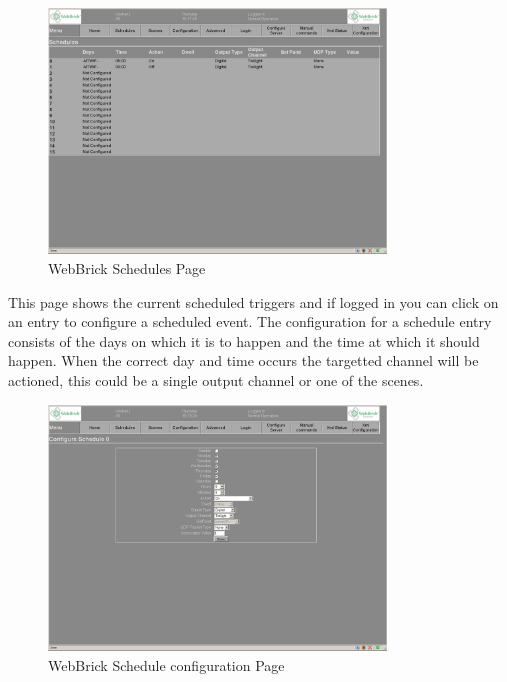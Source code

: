 \begin{figure}[H]
\centering
\includegraphics[width=0.8\textwidth]{Images/schedules.png}
\caption{WebBrick Schedules Page}
\end{figure}

This page shows the current scheduled triggers and if logged in you can click on an entry to configure a scheduled event.
The configuration for a schedule entry consists of the days on which it is to happen and the time at which it should happen. 
When the correct day and time occurs the targetted channel will be actioned, this could be a single output channel or one of 
the scenes.

\begin{figure}[H]
\centering
\includegraphics[width=0.8\textwidth]{Images/schedule.png}
\caption{WebBrick Schedule configuration Page}
\end{figure}

